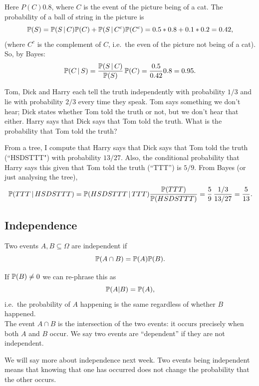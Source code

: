 \begin{sol}
Here $P(C)0.8$, where $C$ is the event of the picture being of a cat. The probability of a ball of string in the picture is 
 \[
   {\mathbb P}(S) = {\mathbb P}(S \, | \, C) {\mathbb P}(C) + {\mathbb P}(S \, | \, C^c) {\mathbb P}(C^c) = 
    0.5 * 0.8 + 0.1 * 0.2 = 0.42,  
 \]
(where $C^c$ is the complement of $C$, i.e.\ the even of the picture not being of a cat).   So, by Bayes: 
 \[
   {\mathbb P}(C \, | \, S) = \frac{{\mathbb P}(S \, | \, C)}{{\mathbb P}(S)} \,{\mathbb P}(C) =
       \frac{0.5}{0.42} 0.8 = 0.95.
 \]
\end{sol}

\begin{exer}
Tom, Dick and Harry each tell the truth independently with probability $1/3$ and lie with probability $2/3$ every time they speak. Tom says something we don't hear; Dick states whether Tom told the truth or not, but we don't hear that either. Harry says that Dick says that Tom told the truth.  What is the probability that Tom told the truth? 
\end{exer}

\begin{sol}
From a tree, I compute that Harry says that Dick says that Tom told the truth (``HSDSTTT") with probability $13/27$. Also, the conditional probability that Harry says this given that Tom told the truth (``TTT'') is $5/9$. From Bayes (or just analysing the tree),
 \[
   {\mathbb P}(TTT \, | \, HSDSTTT ) = {\mathbb P}( HSDSTTT \, | \, TTT) \frac{{\mathbb P}(TTT)}{{\mathbb P}(HSDSTTT)} = \frac59 \, \frac{1/3}{13/27} = \frac5{13}. 
 \]
\end{sol}

\subsection{Independence}
\begin{defn}
Two events $A,B \subseteq \Omega$ are independent if
\[ {\mathbb P}(A \cap B) = {\mathbb P}(A) {\mathbb P}(B).\]
\end{defn}
If ${\mathbb P}(B) \neq 0$ we can re-phrase this as
\[ {\mathbb P}(A \vert B) = {\mathbb P}(A),\]
i.e.\ the probability of $A$ happening is the same regardless of whether $B$ happened. \\ \linebreak
\noindent
The event $A \cap B$ is the intersection of the two events: it occurs precisely when both $A$ and $B$ occur. We say two events are ``dependent'' if they are not independent. 

We will say more about independence next week.  Two events being independent means that knowing that one has occurred does not change the probability that the other occurs.  

